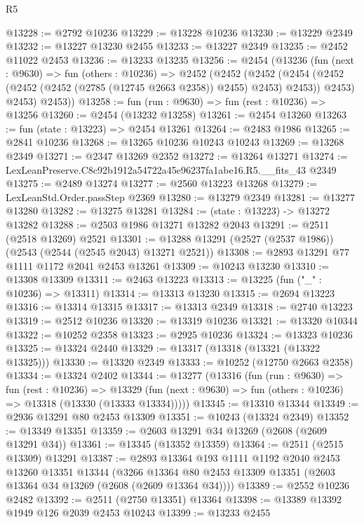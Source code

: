 \begin{lexlean}{R5}
\begin{coremodule}
@13228 := @2792 @10236
@13229 := @13228 @10236
@13230 := @13229 @2349
@13232 := @13227 @13230 @2455
@13233 := @13227 @2349
@13235 := @2452 @11022 @2453
@13236 := @13233 @13235
@13256 := @2454
    (@13236
      (fun (next : @9630) =>
      fun (others : @10236) =>
      @2452
        (@2452
          (@2452
            (@2454 (@2452 (@2452 (@2452 (@2785 (@12745 @2663 @2358)) @2455) @2453) @2453))
            @2453)
          @2453)
        @2453))
@13258 := fun (run : @9630) => fun (rest : @10236) => @13256
@13260 := @2454 (@13232 @13258)
@13261 := @2454 @13260
@13263 := fun (state : @13223) => @2454 @13261
@13264 := @2483 @1986
@13265 := @2841 @10236
@13268 := @13265 @10236 @10243 @10243
@13269 := @13268 @2349
@13271 := @2347 @13269 @2352
@13272 := @13264 @13271
@13274 := LexLeanPreserve.C8c92b1912a54722a45e96237fa1abe16.R5.__fits_43 @2349
@13275 := @2489 @13274
@13277 := @2560 @13223 @13268
@13279 := LexLeanStd.Order.passStep @2369
@13280 := @13279 @2349
@13281 := @13277 @13280
@13282 := @13275 @13281
@13284 := (state : @13223) -> @13272 @13282
@13288 := @2503 @1986 @13271 @13282 @2043
@13291 := @2511 (@2518 @13269) @2521
@13301 := @13288 @13291 (@2527 (@2537 @1986)) (@2543 (@2544 (@2545 @2043) @13271 @2521))
@13308 := @2893 @13291 @77 @1111 @1172 @2041 @2453 @13261
@13309 := @10243 @13230
@13310 := @13308 @13309
@13311 := @2463 @13223
@13313 := @13225 (fun ("_" : @10236) => @13311)
@13314 := @13313 @13230
@13315 := @2694 @13223
@13316 := @13314 @13315
@13317 := @13313 @2349
@13318 := @2740 @13223
@13319 := @2512 @10236
@13320 := @13319 @10236
@13321 := @13320 @10344
@13322 := @10252 @2358
@13323 := @2925 @10236
@13324 := @13323 @10236
@13325 := @13324 @2440
@13329 := @13317 (@13318 (@13321 (@13322 @13325)))
@13330 := @13320 @2349
@13333 := @10252 (@12750 @2663 @2358)
@13334 := @13324 @2402
@13344 := @13277
    (@13316
      (fun (run : @9630) =>
      fun (rest : @10236) =>
      @13329 (fun (next : @9630) => fun (others : @10236) => @13318 (@13330 (@13333 @13334)))))
@13345 := @13310 @13344
@13349 := @2936 @13291 @80 @2453 @13309
@13351 := @10243 (@13324 @2349)
@13352 := @13349 @13351
@13359 := @2603 @13291 @34 @13269 (@2608 (@2609 @13291 @34))
@13361 := @13345 (@13352 @13359)
@13364 := @2511 (@2515 @13309) @13291
@13387 := @2893
    @13364
    @193
    @1111
    @1192
    @2040
    @2453
    @13260
    @13351
    @13344
    (@3266 @13364 @80 @2453 @13309 @13351 (@2603 @13364 @34 @13269 (@2608 (@2609 @13364 @34))))
@13389 := @2552 @10236 @2482
@13392 := @2511 (@2750 @13351) @13364
@13398 := @13389 @13392 @1949 @126 @2039 @2453 @10243
@13399 := @13233 @2455

\end{coremodule}
\end{lexlean}
